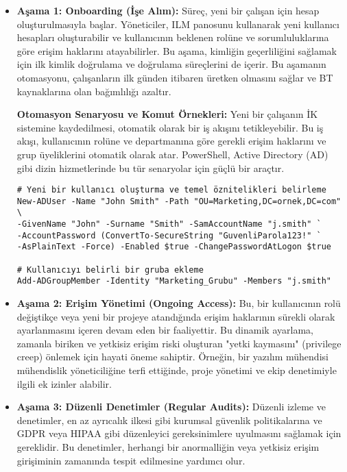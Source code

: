 \begin{itemize}
    \item \textbf{Aşama 1: Onboarding (İşe Alım):} Süreç, yeni bir çalışan için hesap oluşturulmasıyla başlar. Yöneticiler, ILM panosunu kullanarak yeni kullanıcı hesapları oluşturabilir ve kullanıcının beklenen rolüne ve sorumluluklarına göre erişim haklarını atayabilirler. Bu aşama, kimliğin geçerliliğini sağlamak için ilk kimlik doğrulama ve doğrulama süreçlerini de içerir. Bu aşamanın otomasyonu, çalışanların ilk günden itibaren üretken olmasını sağlar ve BT kaynaklarına olan bağımlılığı azaltır.
    
    \textbf{Otomasyon Senaryosu ve Komut Örnekleri:} Yeni bir çalışanın İK sistemine kaydedilmesi, otomatik olarak bir iş akışını tetikleyebilir. Bu iş akışı, kullanıcının rolüne ve departmanına göre gerekli erişim haklarını ve grup üyeliklerini otomatik olarak atar. PowerShell, Active Directory (AD) gibi dizin hizmetlerinde bu tür senaryolar için güçlü bir araçtır.
    
\begin{verbatim}
# Yeni bir kullanıcı oluşturma ve temel öznitelikleri belirleme
New-ADUser -Name "John Smith" -Path "OU=Marketing,DC=ornek,DC=com" \
-GivenName "John" -Surname "Smith" -SamAccountName "j.smith" `
-AccountPassword (ConvertTo-SecureString "GuvenliParola123!" `
-AsPlainText -Force) -Enabled $true -ChangePasswordAtLogon $true

# Kullanıcıyı belirli bir gruba ekleme
Add-ADGroupMember -Identity "Marketing_Grubu" -Members "j.smith"
\end{verbatim}

    \item \textbf{Aşama 2: Erişim Yönetimi (Ongoing Access):} Bu, bir kullanıcının rolü değiştikçe veya yeni bir projeye atandığında erişim haklarının sürekli olarak ayarlanmasını içeren devam eden bir faaliyettir. Bu dinamik ayarlama, zamanla biriken ve yetkisiz erişim riski oluşturan "yetki kaymasını" (privilege creep) önlemek için hayati öneme sahiptir. Örneğin, bir yazılım mühendisi mühendislik yöneticiliğine terfi ettiğinde, proje yönetimi ve ekip denetimiyle ilgili ek izinler alabilir.
    
    \item \textbf{Aşama 3: Düzenli Denetimler (Regular Audits):} Düzenli izleme ve denetimler, en az ayrıcalık ilkesi gibi kurumsal güvenlik politikalarına ve GDPR veya HIPAA gibi düzenleyici gereksinimlere uyulmasını sağlamak için gereklidir. Bu denetimler, herhangi bir anormalliğin veya yetkisiz erişim girişiminin zamanında tespit edilmesine yardımcı olur.
    

\end{itemize}
